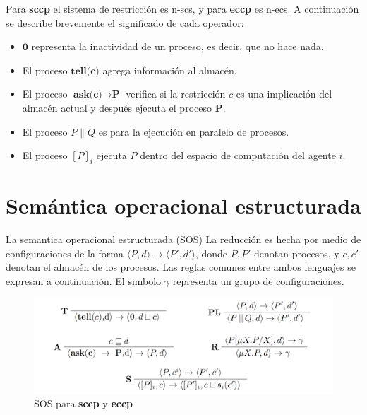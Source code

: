 Para \textbf{sccp} el sistema de restricci\'on es n-scs, y para \textbf{eccp} es n-ecs. A continuaci\'on se describe brevemente el significado de cada operador:

\begin{itemize}
\item $\textbf{0}$ representa la inactividad de un proceso, es decir, que no hace nada.
\item El proceso $\textbf{tell(c)}$ agrega informaci\'on al almac\'en.
\item El proceso $\textbf{ask(c)} \rightarrow \textbf{P}$ verifica si la restricci\'on $c$ es una implicaci\'on del almac\'en actual y despu\'es ejecuta el proceso $\textbf{P}$.
\item El proceso $P\|Q$ es para la ejecuci\'on en paralelo de procesos.
\item El proceso $[P]_i$ ejecuta $P$ dentro del espacio de computaci\'on del agente $i$.
\end{itemize}


\section{Sem\'antica operacional estructurada}
\label{soe.esi}

La semantica operacional estructurada (SOS) 
La reducci\'on es hecha por medio de configuraciones de la forma $\langle P,d\rangle \rightarrow \langle P',d'\rangle$, donde $P,P'$ denotan procesos, y $c,c'$ denotan el almac\'en de los procesos. Las reglas comunes entre ambos lenguajes se expresan a continuaci\'on. El simbolo $\gamma$ representa un grupo de configuraciones.

\begin{figure}[pthb]
  \centering
  \begin{minipage}[c]{0.8\textwidth}%
	\begin{center}
    \includegraphics[width=12cm]{images/sos.png}
  \end{center}
\end{minipage}
  \caption{SOS para \textbf{sccp} y \textbf{eccp}}
  \label{fig.sos}
\end{figure}

